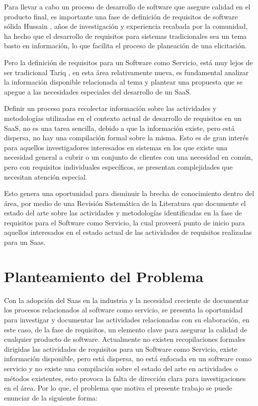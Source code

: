 \documentclass{article}
\begin{document}
Para llevar a cabo un proceso de desarrollo de software que asegure calidad en el producto final, es importante una fase de definición de requisitos de software sólida Hussain \cite{antecedentes4}, años de investigación y 
experiencia recabada por la comunidad, ha hecho que el desarrollo de requisitos para sistemas tradicionales sea un tema basto en información, lo que facilita el proceso de planeación de una elicitación.

Pero la definición de requisitos para un Software como Servicio, está muy lejos de ser tradicional Tariq \cite{antecedentes1}, en esta área relativamente nueva, es fundamental analizar la 
información disponible relacionada al tema y plantear una propuesta que se apegue a las necesidades especiales del desarrollo de un SaaS. 

Definir un proceso para recolectar información sobre las actividades y metodologías utilizadas en el contexto actual de desarrollo de requisitos en un SaaS, no es una tarea sencilla, debido a que la información existe, 
pero está dispersa, no hay una compilación formal sobre la misma. Esto es de gran interés para aquellos investigadores interesados 
en sistemas en los que existe una necesidad general a cubrir o un conjunto de clientes con una necesidad en común, pero con requisitos individuales específicos, se presentan complejidades que necesitan atención especial. 
 
Esto genera una oportunidad para disminuir la brecha de conocimiento dentro del área, por medio de una Revisión Sistemática de la Literatura que documente el estado del arte sobre las actividades y metodologías identificadas
en la fase de requisitos para el Software como Servicio, la cual proveerá punto de inicio para aquellos interesados en el estado actual de las actividades de requisitos realizadas para un Saas. 
\newpage

\section{Planteamiento del Problema}
Con la adopción del Saas en la industria y la necesidad creciente de documentar los procesos relacionados al software como servicio, se presenta la oportunidad para investigar y documentar las actividades 
relacionadas con su elaboración, en este caso, de la fase de requisitos, un elemento clave para asegurar la calidad de cualquier 
producto de software. Actualmente no existen recopilaciones formales dirigidas las actividades de requisitos para un Software como Servicio, existe información disponible, pero está dispersa, no está enfocada en 
un software como servicio y no existe una compilación sobre el estado del arte en actividades o métodos existentes, esto provoca la falta de dirección clara para investigaciones en el área. Por lo que, el problema que 
motiva el presente trabajo se puede enunciar de la siguiente forma:\\
\end{document}
